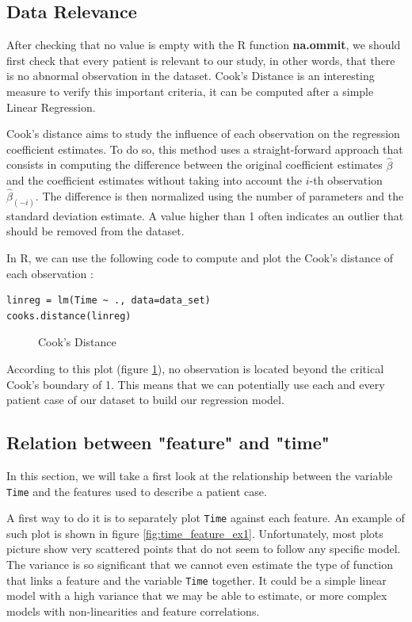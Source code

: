 \documentclass[]{report}
\newcommand{\inputtikz}[2]{%
	\scalebox{#1}{}  
}
\begin{document}
\subsection{Data Relevance}
After checking that no value is empty with the R function \textbf{na.ommit}, we should first check that every patient is relevant to our study, in other words, that there is no abnormal observation in the dataset.  Cook's Distance is an interesting measure to verify this important criteria, it can be computed after a simple Linear Regression.

Cook's distance aims to study the influence of each observation on the regression coefficient estimates. To do so, this method uses a straight-forward approach that consists in computing the difference between the original coefficient estimates $\hat{\beta}$ and the coefficient estimates without taking into account the $i$-th observation $\hat{\beta}_{(-i)}$. The difference is then normalized using the number of parameters and the standard deviation estimate. A value higher than 1 often indicates an outlier that should be removed from the dataset.

In R, we can use the following code to compute and plot the Cook's distance of each observation :

\begin{lstlisting}
linreg = lm(Time ~ ., data=data_set)
cooks.distance(linreg)
\end{lstlisting} 

\begin{figure}[!h]
	\centering
	\inputtikz{0.5}{Figures/cooks_distance.tex}
	\caption{Cook's Distance}
	\label{fig:cook_distance}
\end{figure}

According to this plot (figure \ref{fig:cook_distance}), no observation is located beyond the critical Cook's boundary of 1. This means that we can potentially use each and every patient case of our dataset to build our regression model. 

\subsection{Relation between "feature" and "time"}
In this section, we will take a first look at the relationship between the variable \texttt{Time} and the features used to describe a patient case. 

A first way to do it is to separately plot \texttt{Time} against each feature. An example of such plot is shown in figure \ref{fig:time_feature_ex1}. Unfortunately, most plots picture show very scattered points that do not seem to follow any specific model. The variance is so significant that we cannot even estimate the type of function that links a feature and the variable \texttt{Time} together. It could be a simple linear model with a high variance that we may be able to estimate, or more complex models with non-linearities and feature correlations.
\end{document}
